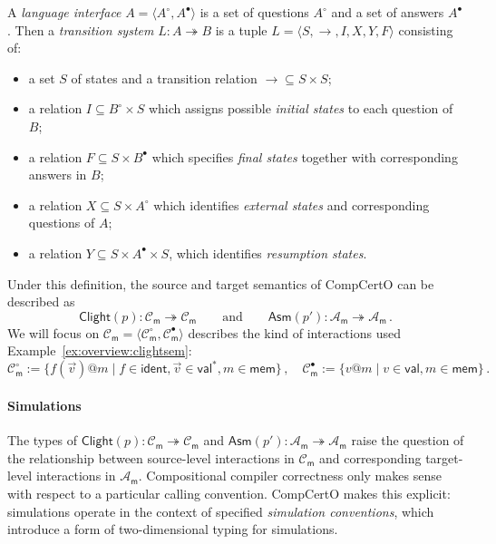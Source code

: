 \documentclass[acmsmall,screen,review,anonymous]{acmart}
\newcommand{\kw}[1]{\ensuremath{ \mathsf{#1} }}
\newcommand{\que}{\circ}
\newcommand{\ans}{\bullet}
\begin{document}
\begin{definition} \label{def:li} \label{def:lts} %
A \emph{language interface} $A = \langle A^\que, A^\ans \rangle$
is a set of questions $A^\que$ and a set of answers $A^\ans$.
Then a \emph{transition system} $L : A \twoheadrightarrow B$
is a tuple $L = \langle S, {\rightarrow}, I, X, Y, F \rangle$
consisting of:
\begin{itemize}
  \item a set $S$ of states and
    a transition relation ${\rightarrow} \subseteq S \times S$;
  \item a relation $I \subseteq B^\que \times S$
    which assigns possible \emph{initial states}
    to each question of $B$;
  \item a relation $F \subseteq S \times B^\ans$
    which specifies \emph{final states} together with
    corresponding answers in $B$;
  \item a relation $X \subseteq S \times A^\que$
    which identifies \emph{external states} and
    corresponding questions of $A$;
  \item a relation $Y \subseteq S \times A^\ans \times S$,
    which identifies \emph{resumption states}.
\end{itemize}
\end{definition}

Under this definition,
the source and target semantics of CompCertO can be described as
\[
  \kw{Clight}(p) : \mathcal{C}_\kw{m} \twoheadrightarrow \mathcal{C}_\kw{m}
  \qquad \text{and} \qquad
  \kw{Asm}(p') : \mathcal{A}_\kw{m} \twoheadrightarrow \mathcal{A}_\kw{m} \,.
\]
We will focus on
$\mathcal{C}_\kw{m} = \langle \mathcal{C}_\kw{m}^\que, \mathcal{C}_\kw{m}^\ans \rangle$
describes the kind of interactions used Example~\ref{ex:overview:clightsem}:
\[
  \mathcal{C}_\kw{m}^\que :=
    \{ f(\vec{v})@m \mid f \in \kw{ident}, \vec{v} \in \kw{val}^*, m \in \kw{mem} \}
  \,,
  \quad
  \mathcal{C}_\kw{m}^\ans :=
    \{ v@m \mid v \in \kw{val}, m \in \kw{mem} \}
  \,.
\]


\paragraph{Simulations} %

The types of
$\kw{Clight}(p) : \mathcal{C}_\kw{m} \twoheadrightarrow \mathcal{C}_\kw{m}$ and
$\kw{Asm}(p') : \mathcal{A}_\kw{m} \twoheadrightarrow \mathcal{A}_\kw{m}$
raise the question of the relationship
between source-level interactions
in $\mathcal{C}_\kw{m}$
and corresponding target-level interactions
in $\mathcal{A}_\kw{m}$.
Compositional compiler correctness only makes sense
with respect to a particular calling convention.
%
CompCertO makes this explicit:
simulations operate in the context of specified
\emph{simulation conventions},
which introduce a form of two-dimensional typing for simulations.
\end{document}
